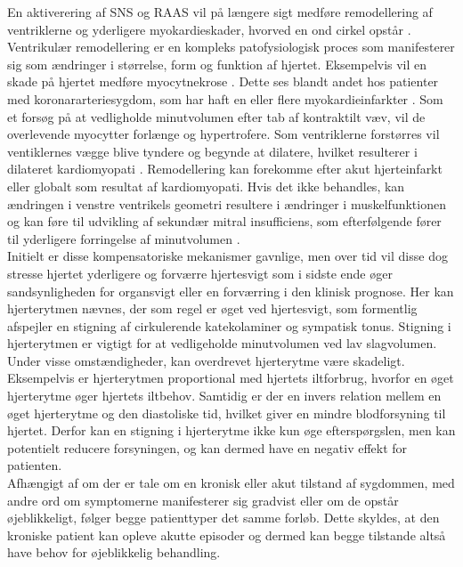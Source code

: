 En aktiverering af SNS og RAAS vil på længere sigt medføre remodellering af ventriklerne og yderligere myokardieskader, hvorved en ond cirkel opstår \citep{Braunwald2013}. Ventrikulær remodellering er en kompleks patofysiologisk proces som manifesterer sig som ændringer i størrelse, form og funktion af hjertet. Eksempelvis vil en skade på hjertet medføre myocytnekrose \citep{Cohn2000}. Dette ses blandt andet hos patienter med koronararteriesygdom, som har haft en eller flere myokardieinfarkter \citep{Page1971}. Som et forsøg på at vedligholde minutvolumen efter tab af kontraktilt væv, vil de overlevende myocytter forlænge og hypertrofere. Som ventriklerne forstørres vil ventiklernes vægge blive tyndere og begynde at dilatere, hvilket resulterer i dilateret kardiomyopati \citep{Cohn2000}. Remodellering kan forekomme efter akut hjerteinfarkt eller globalt som resultat af kardiomyopati. Hvis det ikke behandles, kan ændringen i venstre ventrikels geometri resultere i ændringer i muskelfunktionen og kan føre til udvikling af sekundær mitral insufficiens, som efterfølgende fører til yderligere forringelse af minutvolumen \citep{Gheorghiade1998}.\\
Initielt er disse kompensatoriske mekanismer gavnlige, men over tid vil disse dog stresse hjertet yderligere og forværre hjertesvigt \citep{Mccance1998} som i sidste ende øger sandsynligheden for organsvigt eller en forværring i den klinisk prognose\citep{Mudd2008}. Her kan hjerterytmen nævnes, der som regel er øget ved hjertesvigt, som formentlig afspejler en stigning af cirkulerende katekolaminer og sympatisk tonus. Stigning i hjerterytmen er vigtigt for at vedligeholde minutvolumen ved lav slagvolumen. Under visse omstændigheder, kan overdrevet  hjerterytme være skadeligt. Eksempelvis er hjerterytmen proportional med hjertets iltforbrug, hvorfor en øget hjerterytme øger hjertets iltbehov. Samtidig er der en invers relation mellem en øget hjerterytme og den diastoliske tid, hvilket giver en mindre blodforsyning til hjertet. Derfor kan en stigning i hjerterytme ikke kun øge efterspørgslen, men kan potentielt reducere forsyningen, og kan dermed have en negativ effekt for patienten. \citep{Parmley1985}\\
Afhængigt af om der er tale om en kronisk eller akut tilstand af sygdommen, med andre ord om symptomerne manifesterer sig gradvist eller om de opstår øjeblikkeligt, følger begge patienttyper det samme forløb. Dette skyldes, at den kroniske patient kan opleve akutte episoder og dermed kan begge tilstande altså have behov for øjeblikkelig behandling.

